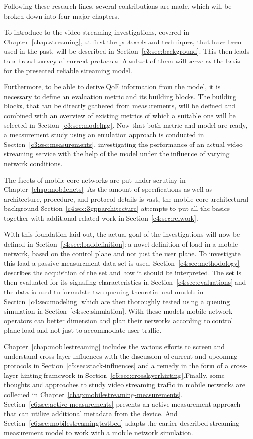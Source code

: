 Following these research lines, several contributions are made, which will be broken down into four major chapters.

To introduce to the video streaming investigations, covered in Chapter~\ref{chap:streaming}, at first the protocols and techniques, that have been used in the past, will be described in Section~\ref{c3:sec:background}. This then leads to a broad survey of current protocols. A subset of them will serve as the basis for the presented reliable streaming model. 

Furthermore, to be able to derive \gls{QoE} information from the model, it is necessary to define an evaluation metric and its building blocks. The building blocks, that can be directly gathered from measurements, will be defined and combined with an overview of existing metrics of which a suitable one will be selected in Section~\ref{c3:sec:modeling}. Now that both metric and model are ready, a measurement study using an emulation approach is conducted in Section~\ref{c3:sec:measurements}, investigating the performance of an actual video streaming service with the help of the model under the influence of varying network conditions.

The facets of mobile core networks are put under scrutiny in Chapter~\ref{chap:mobilenets}. As the amount of specifications as well as architecture, procedure, and protocol details is vast, the mobile core architectural background Section~\ref{c4:sec:3gpparchitecture} attempts to put all the basics together with additional related work in Section~\ref{c4:sec:relwork}.

With this foundation laid out, the actual goal of the investigations will now be defined in Section~\ref{c4:sec:loaddefinition}: a novel definition of load in a mobile network, based on the control plane and not just the user plane. To investigate this load a passive measurement data set is used. Section~\ref{c4:sec:methodology} describes the acquisition of the set and how it should be interpreted. The set is then evaluated for its signaling characteristics in Section~\ref{c4:sec:evaluations} and the data is used to formulate two queuing theoretic load models in Section~\ref{c4:sec:modeling} which are then thoroughly  tested using a queuing simulation in Section~\ref{c4:sec:simulation}. With these models mobile network operators can better dimension and plan their networks according to control plane load and not just to accommodate user traffic.


Chapter~\ref{chap:mobilestreaming} includes the various efforts to screen and understand cross-layer influences with the discussion of current and upcoming protocols in Section~\ref{c5:sec:stack-influences} and a remedy in the form of a cross-layer hinting framework in Section~\ref{c5:sec:crosslayerhinting}.Finally, some thoughts and approaches to study video streaming traffic in mobile networks are collected in Chapter~\ref{chap:mobilestreaming-measurements}. Section~\ref{c6:sec:active-measurements} presents an active measurement approach that can utilize additional metadata from the device. And Section~\ref{c6:sec:mobilestreamingtestbed} adapts the earlier described streaming measurement model to work with a mobile network simulation.


